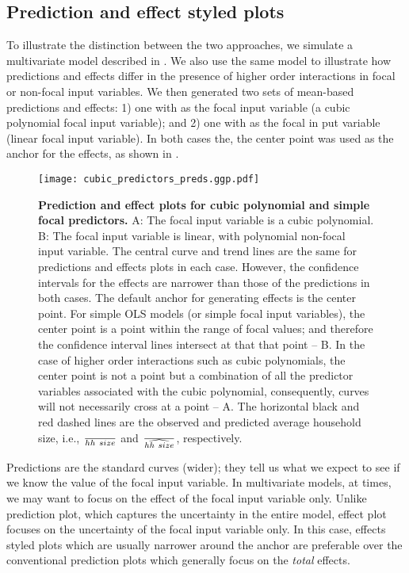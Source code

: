 \subsection{Prediction and effect styled plots}

To illustrate the distinction between the two approaches, we simulate a multivariate model described in . We also use the same model to illustrate how predictions and effects differ in the presence of higher order interactions in focal or non-focal input variables. We then generated two sets of mean-based predictions and effects: 1) one with  as the focal input variable (a cubic polynomial focal input variable); and 2) one with  as the focal in put variable (linear focal input variable). In both cases the, the center point was used as the anchor for the effects, as shown in .

\begin{figure}
\begin{center}
\texttt{[image: cubic\_predictors\_preds.ggp.pdf]}
\end{center}
\caption{{\bf Prediction and effect plots for cubic polynomial and simple focal predictors.} A: The focal input variable is a cubic polynomial. B: The focal input variable is linear, with polynomial non-focal input variable. The central curve and trend lines are the same for predictions and effects plots in each case. However, the confidence intervals for the effects are narrower than those of the predictions in both cases. The default anchor for generating effects is the center point. For simple OLS models (or simple focal input variables), the center point is a point within the range of focal values; and therefore the confidence interval lines intersect at that that point -- B. In the case of higher order interactions such as cubic polynomials, the center point is not a point but a combination of all the predictor variables associated with the cubic polynomial, consequently, curves will not necessarily cross at a point -- A. The horizontal black and red dashed lines are the observed and predicted average household size, i.e., $\over{hh~size}$ and $\over{\widehat{hh~size}}$, respectively.}
\label{fig:pred_cubic_plots}
\end{figure}

Predictions are the standard curves (wider); they tell us what we expect to see if we know the value of the focal input variable. In multivariate models, at times, we may want to focus on the effect of the focal input variable only. Unlike prediction plot, which captures the uncertainty in the entire model, effect plot focuses on the uncertainty of the focal input variable only. In this case, effects styled plots which are usually narrower around the anchor are preferable over the conventional prediction plots which generally focus on the \emph{total} effects. 

